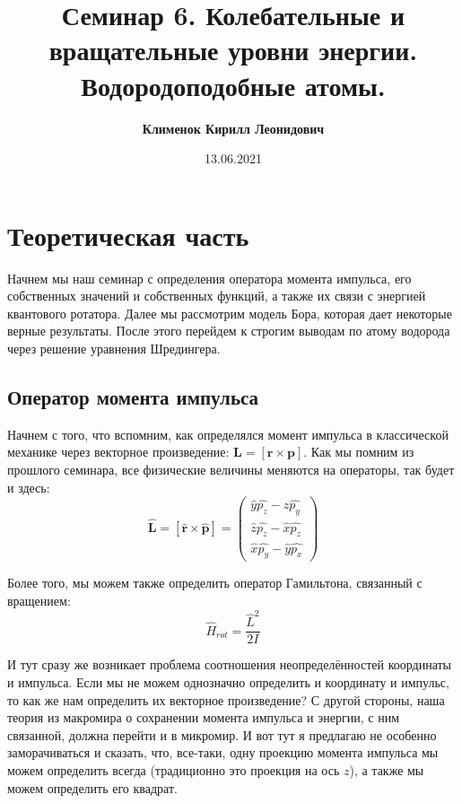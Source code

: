 \documentclass[12pt]{article}
\begin{document}
 
\title{\textbf{Семинар 6. Колебательные и вращательные уровни энергии. Водородоподобные атомы.}}
\author{\textbf{Клименок Кирилл Леонидович}}
\date{13.06.2021}
\maketitle
\section{Теоретическая часть}
Начнем мы наш семинар с определения оператора момента импульса, его собственных значений и собственных функций,  а также их связи с энергией квантового ротатора. Далее мы рассмотрим модель Бора, которая дает некоторые верные результаты. После этого перейдем к строгим выводам по атому водорода через решение уравнения Шредингера. 

\subsection{Оператор момента импульса}
Начнем с того, что вспомним, как определялся момент импульса в классической механике через векторное произведение: $\textbf{L} = [\textbf{r} \times \textbf{p}]$. Как мы помним из прошлого семинара, все физические величины меняются на операторы, так будет и здесь:
\begin{equation}
    \hat{\textbf{L}} = [\hat{\textbf{r}}\times \hat{\textbf{p}}] = \left(\begin{array}{c}
        \hat{y}\hat{p_z} - \hat{z}\hat{p_y}\\
        \hat{z}\hat{p_z} - \hat{x}\hat{p_z}\\
        \hat{x}\hat{p_y} - \hat{y}\hat{p_x} 
    \end{array}\right)
\end{equation}

\vspace{1em} \noindent
Более того, мы можем также определить оператор Гамильтона, связанный с вращением:
\begin{equation}
    \hat{H}_{rot} = \dfrac{\hat{L}^2}{2I}
\end{equation}

\vspace{1em} \noindent
И тут сразу же возникает проблема соотношения неопределённостей координаты и импульса. Если мы не можем однозначно определить и координату и импульс, то как же нам определить их векторное произведение? С другой стороны, наша теория из макромира о сохранении момента импульса и энергии, с ним связанной, должна перейти и в микромир. И вот тут я предлагаю не особенно заморачиваться и сказать, что, все-таки, одну проекцию момента импульса мы можем определить всегда (традиционно это проекция на ось $z$), а также мы можем определить его квадрат.
\end{document}
